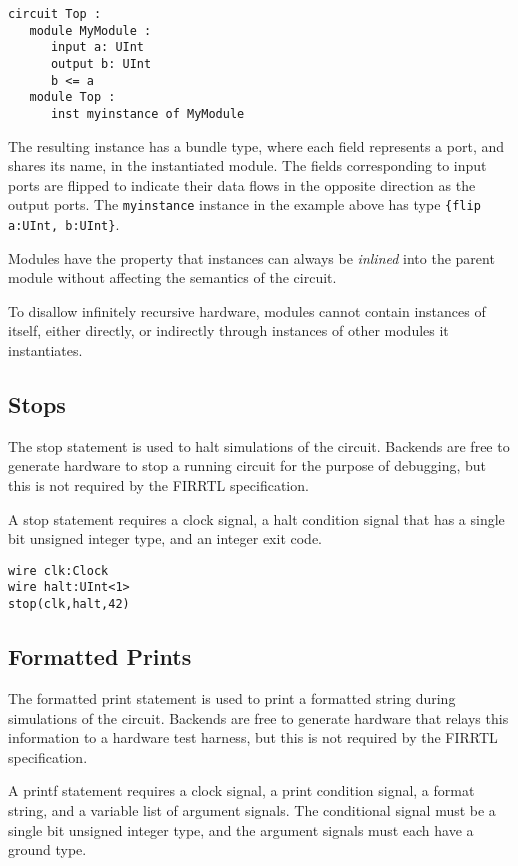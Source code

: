 \documentclass[12pt]{article}
\begin{document}
\begin{verbatim}
circuit Top :
   module MyModule :
      input a: UInt
      output b: UInt
      b <= a
   module Top :
      inst myinstance of MyModule   
\end{verbatim}

The resulting instance has a bundle type, where each field represents a port, and shares its name, in the instantiated module. The fields corresponding to input ports are flipped to indicate their data flows in the opposite direction as the output ports. The \verb|myinstance| instance in the example above has type \verb|{flip a:UInt, b:UInt}|.

Modules have the property that instances can always be {\em inlined} into the parent module without affecting the semantics of the circuit.

To disallow infinitely recursive hardware, modules cannot contain instances of itself, either directly, or indirectly through instances of other modules it instantiates. 

\subsection{Stops}
The stop statement is used to halt simulations of the circuit. Backends are free to generate hardware to stop a running circuit for the purpose of debugging, but this is not required by the FIRRTL specification.

A stop statement requires a clock signal, a halt condition signal that has a single bit unsigned integer type, and an integer exit code.

\begin{verbatim}
wire clk:Clock
wire halt:UInt<1>
stop(clk,halt,42)
\end{verbatim}

\subsection{Formatted Prints}
The formatted print statement is used to print a formatted string during simulations of the circuit. Backends are free to generate hardware that relays this information to a hardware test harness, but this is not required by the FIRRTL specification.

A printf statement requires a clock signal, a print condition signal, a format string, and a variable list of argument signals. The conditional signal must be a single bit unsigned integer type, and the argument signals must each have a ground type.
\end{document}
